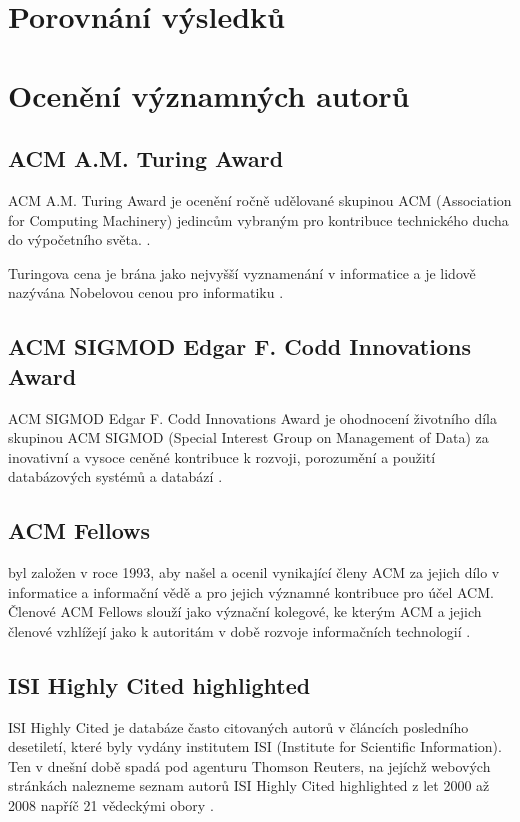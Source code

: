 \documentclass[12pt,titlepage]{report}
\begin{document}
\section{Porovnání výsledků}

\section{Ocenění významných autorů}
\subsection{ACM A.M. Turing Award}
ACM A.M. Turing Award je ocenění ročně udělované skupinou ACM (Association for
Computing Machinery) jedincům vybraným pro kontribuce technického ducha do
výpočetního světa.
\cite{turingaward}.

Turingova cena je brána jako nejvyšší vyznamenání v informatice a je lidově
nazývána Nobelovou cenou pro informatiku \cite[p.~317]{dasgupta}.

\subsection{ACM SIGMOD Edgar F. Codd Innovations Award}
ACM SIGMOD Edgar F. Codd Innovations Award je ohodnocení životního díla
skupinou ACM SIGMOD (Special Interest Group on Management of Data)  za
inovativní a vysoce ceněné kontribuce k rozvoji, porozumění a použití
databázových systémů a databází \cite{sigmodinnovations}.

\subsection{ACM Fellows}
 byl založen v roce 1993, aby našel a ocenil
vynikající členy ACM za jejich dílo v informatice a informační vědě a pro
jejich významné kontribuce pro účel ACM. Členové ACM Fellows slouží jako
význační kolegové, ke kterým ACM a jejich členové vzhlížejí jako k autoritám v
době rozvoje informačních technologií \cite{acmfellows}.

\subsection{ISI Highly Cited highlighted}
ISI Highly Cited je databáze často citovaných autorů v článcích posledního
desetiletí, které byly vydány institutem ISI (Institute for Scientific
Information). Ten v dnešní době spadá pod agenturu Thomson Reuters, na jejíchž webových stránkách nalezneme seznam autorů ISI Highly Cited highlighted z let 2000 až 2008 napříč 21 vědeckými obory \cite{highlycited}.
\end{document}
